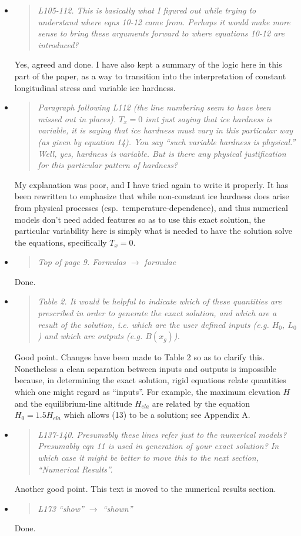 \documentclass[11pt,reqno]{amsart}
\newcommand{\reply}[2]{
\medskip\medskip
\item  \begin{quote}
\emph{#1}
\end{quote}

\medskip
\noindent #2}
\begin{document}
\begin{itemize}
\reply{L105-112. This is basically what I figured out while trying to understand where eqns 10-12 came from. Perhaps it would make more sense to bring these arguments forward to where equations 10-12 are introduced?}
{Yes, agreed and done.  I have also kept a summary of the logic here in this part of the paper, as a way to transition into the interpretation of constant longitudinal stress and variable ice hardness.}

\reply{Paragraph following L112 (the line numbering seem to have been missed out in places). $T_x=0$ isnt just saying that ice hardness is variable, it is saying that ice hardness must vary in this particular way (as given by equation 14).  You say ``such variable hardness is physical.''  Well, yes, hardness is variable. But is there any physical justification for this particular pattern of hardness?}
{My explanation was poor, and I have tried again to write it properly.  It has been rewritten to emphasize that while non-constant ice hardness does arise from physical processes (esp.~temperature-dependence), and thus numerical models don't need added features so as to use this exact solution, the particular variability here is simply what is needed to have the solution solve the equations, specifically $T_x=0$.}

\reply{Top of page 9. Formulas $\to$ formulae}
{Done.}

\reply{Table 2. It would be helpful to indicate which of these quantities are prescribed in order to generate the exact solution, and which are a result of the solution, i.e. which are the user defined inputs (e.g. $H_0$, $L_0$) and which are outputs (e.g. $B(x_g)$).}
{Good point.  Changes have been made to Table 2 so as to clarify this.  Nonetheless a clean separation between inputs and outputs is impossible because, in determining the exact solution, rigid equations relate quantities which one might regard as ``inputs''.  For example, the maximum elevation $H$ and the equilibrium-line altitude $H_{ela}$ are related by the equation $H_0 = 1.5 H_{ela}$ which allows (13) to be a solution; see Appendix A.}

\reply{L137-140. Presumably these lines refer just to the numerical models? Presumably eqn 11 is used in generation of your exact solution? In which case it might be better to move this to the next section, ``Numerical Results''.}
{Another good point.  This text is moved to the numerical results section.}

\reply{L173 ``show'' $\to$ ``shown''}
{Done.}


\end{itemize}
\end{document}
